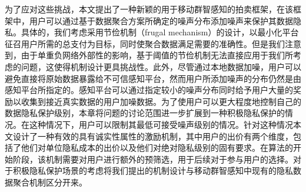 	为了应对这些挑战，本文提出了一种新颖的用于移动群智感知的拍卖框架，在该框架中，用户可以通过基于数据聚合方案所确定的噪声分布添加噪声来保护其数据隐私。具体的，我们考虑采用节俭机制（frugal mechanism）的设计\cite{frugal, AGT}，以最小化平台征召用户所需的总支付为目标，同时使聚合数据满足需要的准确性。但是我们注意到，由于单重负网络外部性的影响，基于阈值的节俭机制\cite{frugal,milgrom2004putting}无法直接应用于我们所考虑的问题，这使得机制设计更具挑战性。此外，尽管通过本地数据加噪，用户可以避免直接将原始数据暴露给不可信感知平台，然而用户所添加噪声的分布仍然是由感知平台所指定的。感知平台可以通过指定较小的噪声分布同时给予用户大量的奖励以收集到接近真实数据的用户加噪数据。为了使用户可以更大程度地控制自己的数据隐私保护级别，本章将问题的讨论范围进一步扩展到一种积极隐私保护的情况。在这种情况下，用户可以限制其最低可接受噪声级别的情况。针对这种情况本文设计了一种有效的具有诚实性属性的激励机制，其中用户的出价有两个维度，包括了他们对单位隐私成本的出价以及他们对绝对隐私级别的固有要求。在算法的开始阶段，该机制需要对用户进行额外的预筛选，用于后续对于参与用户的选择。对于积极隐私保护场景的考虑将我们提出的机制设计与移动群智感知中现有的隐私数据聚合机制\cite{jin2015quality, jin2016inception,zhang2016privacy}区分开来。
	
